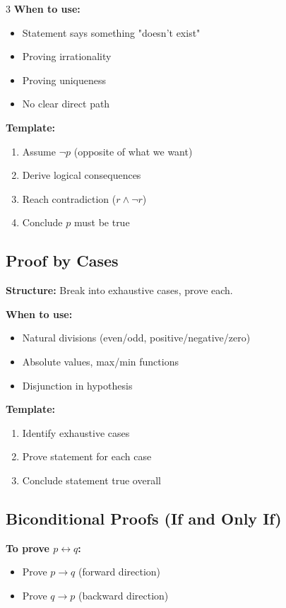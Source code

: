 \documentclass[8pt]{article}
\begin{document}
\begin{multicols}{3}
\textbf{When to use:}
\begin{itemize}[nosep]
\item Statement says something "doesn't exist"
\item Proving irrationality
\item Proving uniqueness
\item No clear direct path
\end{itemize}

\textbf{Template:}
\begin{enumerate}[nosep]
\item Assume $\neg p$ (opposite of what we want)
\item Derive logical consequences
\item Reach contradiction ($r \land \neg r$)
\item Conclude $p$ must be true
\end{enumerate}


\subsection*{Proof by Cases}
\textbf{Structure:} Break into exhaustive cases, prove each.

\textbf{When to use:}
\begin{itemize}[nosep]
\item Natural divisions (even/odd, positive/negative/zero)
\item Absolute values, max/min functions
\item Disjunction in hypothesis
\end{itemize}

\textbf{Template:}
\begin{enumerate}[nosep]
\item Identify exhaustive cases
\item Prove statement for each case
\item Conclude statement true overall
\end{enumerate}



\subsection*{Biconditional Proofs (If and Only If)}
\textbf{To prove $p \leftrightarrow q$:}
\begin{itemize}[nosep]
\item Prove $p \to q$ (forward direction)
\item Prove $q \to p$ (backward direction)
\end{itemize}



\end{multicols}
\end{document}

